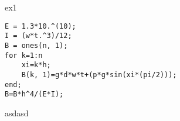ex1

\begin{lstlisting}
E = 1.3*10.^(10); 
I = (w*t.^3)/12; 
B = ones(n, 1);
for k=1:n
    xi=k*h; 
    B(k, 1)=g*d*w*t+(p*g*sin(xi*(pi/2)));
end;
B=B*h^4/(E*I);
  \end{lstlisting}
  asdasd